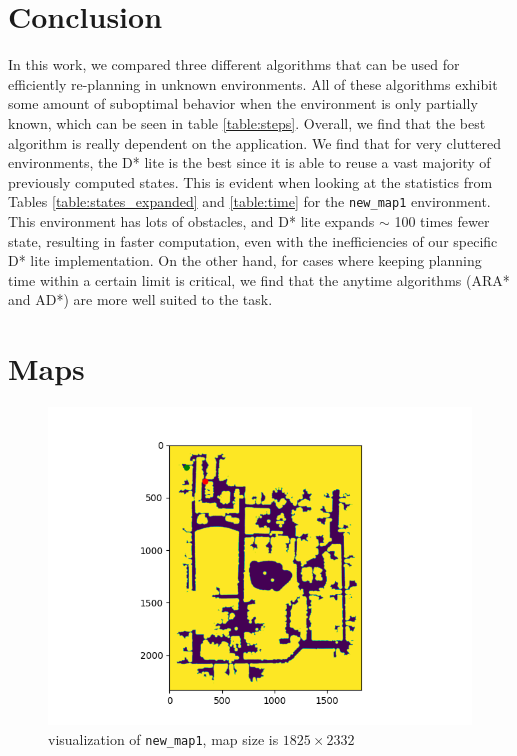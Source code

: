 \documentclass{article}
\begin{document}
\section{Conclusion}
\quad In this work, we compared three different algorithms that can be used for efficiently re-planning in unknown environments. All of these algorithms exhibit some amount of suboptimal behavior when the environment is only partially known, which can be seen in table \ref{table:steps}. Overall, we find that the best algorithm is really dependent on the application. We find that for very cluttered environments, the D* lite is the best since it is able to reuse a vast majority of previously computed states. This is evident when looking at the statistics from Tables \ref{table:states_expanded} and \ref{table:time} for the \texttt{new\_map1} environment. This environment has lots of obstacles, and D* lite expands $\sim$ 100 times fewer state, resulting in faster computation, even with the inefficiencies of our specific D* lite implementation. On the other hand, for cases where keeping planning time within a certain limit is critical, we find that the anytime algorithms (ARA* and AD*) are more well suited to the task.



\printbibliography

\appendix
\section{Maps} \label{sec:maps}
\begin{figure}[H]
    \centering
    \includegraphics[width=0.8\linewidth]{new_map1.png}
    \caption{visualization of \texttt{new\_map1}, map size is $1825 \times 2332$ }
    \label{fig:map1}
\end{figure}
\end{document}
